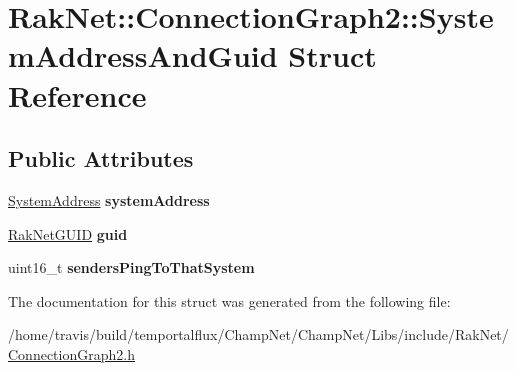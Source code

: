 \hypertarget{struct_rak_net_1_1_connection_graph2_1_1_system_address_and_guid}{\section{Rak\-Net\-:\-:Connection\-Graph2\-:\-:System\-Address\-And\-Guid Struct Reference}
\label{struct_rak_net_1_1_connection_graph2_1_1_system_address_and_guid}
}
\subsection*{Public Attributes}
\begin{DoxyCompactItemize}
\item 
\hypertarget{struct_rak_net_1_1_connection_graph2_1_1_system_address_and_guid_ad9dbe67e0bf46a17977538b4427c5c1e}{\hyperlink{struct_rak_net_1_1_system_address}{System\-Address} {\bfseries system\-Address}}\label{struct_rak_net_1_1_connection_graph2_1_1_system_address_and_guid_ad9dbe67e0bf46a17977538b4427c5c1e}

\item 
\hypertarget{struct_rak_net_1_1_connection_graph2_1_1_system_address_and_guid_af1b5879c4ef2728591a94c9a6507b6b8}{\hyperlink{struct_rak_net_1_1_rak_net_g_u_i_d}{Rak\-Net\-G\-U\-I\-D} {\bfseries guid}}\label{struct_rak_net_1_1_connection_graph2_1_1_system_address_and_guid_af1b5879c4ef2728591a94c9a6507b6b8}

\item 
\hypertarget{struct_rak_net_1_1_connection_graph2_1_1_system_address_and_guid_a5891c3d632acffa2c755d6d8cfd4cb04}{uint16\-\_\-t {\bfseries senders\-Ping\-To\-That\-System}}\label{struct_rak_net_1_1_connection_graph2_1_1_system_address_and_guid_a5891c3d632acffa2c755d6d8cfd4cb04}

\end{DoxyCompactItemize}


The documentation for this struct was generated from the following file\-:\begin{DoxyCompactItemize}
\item 
/home/travis/build/temportalflux/\-Champ\-Net/\-Champ\-Net/\-Libs/include/\-Rak\-Net/\hyperlink{_connection_graph2_8h}{Connection\-Graph2.\-h}\end{DoxyCompactItemize}
